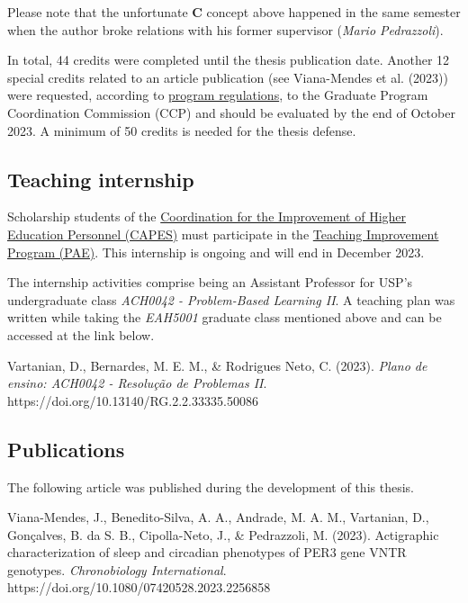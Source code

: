 \documentclass[
  12pt,
  a4paper,
  oneside]{tesesusp}
\begin{document}
Please note that the unfortunate \textbf{C} concept above happened in
the same semester when the author broke relations with his former
supervisor (\emph{Mario Pedrazzoli}).

In total, 44 credits were completed until the thesis publication date.
Another 12 special credits related to an article publication (see
Viana-Mendes et al. (2023)) were requested, according to
\href{https://leginf.usp.br/?resolucao=resolucao-copgr-no-7829-de-03-de-outubro-de-2019}{program
regulations}, to the Graduate Program Coordination Commission (CCP) and
should be evaluated by the end of October 2023. A minimum of 50 credits
is needed for the thesis defense.

\hypertarget{teaching-internship}{%
\subsection{Teaching internship}\label{teaching-internship}}

Scholarship students of the
\href{https://www.gov.br/capes/}{Coordination for the Improvement of
Higher Education Personnel (CAPES)} must participate in the
\href{www5.each.usp.br/pae/}{Teaching Improvement Program (PAE)}. This
internship is ongoing and will end in December 2023.

The internship activities comprise being an Assistant Professor for
USP's undergraduate class \emph{ACH0042 - Problem-Based Learning II}. A
teaching plan was written while taking the \emph{EAH5001} graduate class
mentioned above and can be accessed at the link below.

Vartanian, D., Bernardes, M. E. M., \& Rodrigues Neto, C. (2023).
\emph{Plano de ensino: ACH0042 - Resolução de Problemas II}.
https://doi.org/10.13140/RG.2.2.33335.50086

\hypertarget{publications}{%
\subsection{Publications}\label{publications}}

The following article was published during the development of this
thesis.

Viana-Mendes, J., Benedito-Silva, A. A., Andrade, M. A. M., Vartanian,
D., Gonçalves, B. da S. B., Cipolla-Neto, J., \& Pedrazzoli, M. (2023).
Actigraphic characterization of sleep and circadian phenotypes of PER3
gene VNTR genotypes. \emph{Chronobiology International}.
https://doi.org/10.1080/07420528.2023.2256858
\end{document}
